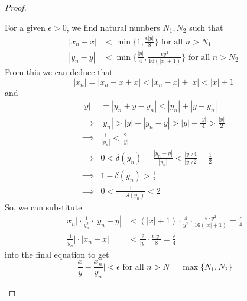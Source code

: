 \begin{proof}
\begin{enumerate}
      For a given $\epsilon > 0$, we find natural numbers $N_1, N_2$ such that 
      \begin{align}
        |x_n - x| & < \min\Big\{ 1, \frac{\epsilon|y|}{8} \Big\} \text{ for all } n > N_1 \\
        |y_n - y| & < \min \Big\{ \frac{|y|}{4}, \frac{\epsilon y^2}{16(|x| + 1)} \Big\} \text{ for all } n > N_2 
      \end{align}
      From this we can deduce that 
      \begin{equation}
        |x_n| = |x_n - x + x| < |x_n - x| + |x| < |x| + 1
      \end{equation}
      and
      \begin{align}
        |y| & = |y_n + y - y_n| < |y_n| + |y - y_n| \\
        \implies & |y_n| > |y| - |y_n - y| > |y| - \frac{|y|}{4} > \frac{|y|}{2} \\
        \implies & \frac{1}{|y_n|} < \frac{2}{|y|} \\
        \implies & 0 < \delta(y_n) = \frac{|y_n - y|}{|y_n|} < \frac{|y|/4}{|y|/2} = \frac{1}{2} \\
        \implies & 1 - \delta(y_n) > \frac{1}{2}\\
        \implies & 0 < \frac{1}{1 - \delta(y_n)} < 2
      \end{align}
      So, we can substitute 
      \begin{align}
        |x_n| \cdot \frac{1}{y_n^2} \cdot |y_n - y| & < (|x| + 1) \cdot \frac{4}{y^2} \cdot \frac{\epsilon \cdot y^2}{16(|x|+1)} = \frac{\epsilon}{4} \\
        \bigg|\frac{1}{y_n} \bigg| \cdot |x_n - x| & < \frac{2}{|y|} \cdot \frac{\epsilon |y|}{8} = \frac{\epsilon}{4} 
      \end{align}
      into the final equation to get
      \begin{equation}
        \bigg| \frac{x}{y} - \frac{x_n}{y_n}\bigg| < \epsilon \text{ for all } n > N= \max\{N_1, N_2\}
      \end{equation}
    \end{enumerate}
  \end{proof}

